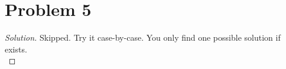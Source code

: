 \section*{Problem 5}
	\begin{proof} [Solution]
		Skipped. Try it case-by-case. You only find one possible solution if exists.\\
	\end{proof}